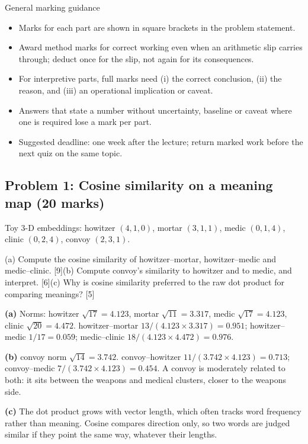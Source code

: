 \documentclass[11pt]{article}
\begin{document}
\begin{instr}{General marking guidance}\begin{itemize}
\item Marks for each part are shown in square brackets in the problem statement.
\item Award method marks for correct working even when an arithmetic slip carries through; deduct once for the slip, not again for its consequences.
\item For interpretive parts, full marks need (i) the correct conclusion, (ii) the reason, and (iii) an operational implication or caveat.
\item Answers that state a number without uncertainty, baseline or caveat where one is required lose a mark per part.
\item Suggested deadline: one week after the lecture; return marked work before the next quiz on the same topic.
\end{itemize}\end{instr}

\subsection{Problem 1: Cosine similarity on a meaning map \normalfont\small\color{GreyN}(20 marks)}

\begin{prob}Toy 3-D embeddings: howitzer $(4,1,0)$, mortar $(3,1,1)$, medic $(0,1,4)$, clinic $(0,2,4)$, convoy $(2,3,1)$.

(a) Compute the cosine similarity of howitzer--mortar, howitzer--medic and medic--clinic. [9]\newline (b) Compute convoy's similarity to howitzer and to medic, and interpret. [6]\newline (c) Why is cosine similarity preferred to the raw dot product for comparing meanings? [5]\end{prob}

\begin{soln}\textbf{(a)} Norms: howitzer $\sqrt{17}=4.123$, mortar $\sqrt{11}=3.317$, medic $\sqrt{17}=4.123$, clinic $\sqrt{20}=4.472$. howitzer--mortar $13/(4.123\times3.317)=\mathbf{0.951}$; howitzer--medic $1/17=\mathbf{0.059}$; medic--clinic $18/(4.123\times4.472)=\mathbf{0.976}$.

\textbf{(b)} convoy norm $\sqrt{14}=3.742$. convoy--howitzer $11/(3.742\times4.123)=\mathbf{0.713}$; convoy--medic $7/(3.742\times4.123)=\mathbf{0.454}$. A convoy is moderately related to both: it sits between the weapons and medical clusters, closer to the weapons side.

\textbf{(c)} The dot product grows with vector length, which often tracks word frequency rather than meaning. Cosine compares direction only, so two words are judged similar if they point the same way, whatever their lengths.\end{soln}
\end{document}
